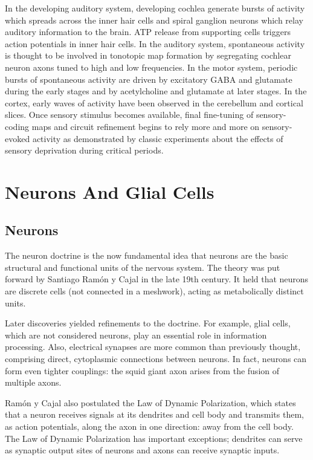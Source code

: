 In the developing auditory system, developing cochlea generate bursts of activity which spreads across the inner hair cells and spiral ganglion neurons which relay auditory information to the brain. ATP release from supporting cells triggers action potentials in inner hair cells. In the auditory system, spontaneous activity is thought to be involved in tonotopic map formation by segregating cochlear neuron axons tuned to high and low frequencies. In the motor system, periodic bursts of spontaneous activity are driven by excitatory GABA and glutamate during the early stages and by acetylcholine and glutamate at later stages. In the cortex, early waves of activity have been observed in the cerebellum and cortical slices. Once sensory stimulus becomes available, final fine-tuning of sensory-coding maps and circuit refinement begins to rely more and more on sensory-evoked activity as demonstrated by classic experiments about the effects of sensory deprivation during critical periods.

\hypertarget{neurons-and-glial-cells}{%
\chapter{Neurons And Glial Cells}\label{neurons-and-glial-cells}}

\hypertarget{neurons}{%
\section{Neurons}\label{neurons}}

The neuron doctrine is the now fundamental idea that neurons are the basic structural and functional units of the nervous system. The theory was put forward by Santiago Ramón y Cajal in the late 19th century. It held that neurons are discrete cells (not connected in a meshwork), acting as metabolically distinct units.

Later discoveries yielded refinements to the doctrine. For example, glial cells, which are not considered neurons, play an essential role in information processing. Also, electrical synapses are more common than previously thought, comprising direct, cytoplasmic connections between neurons. In fact, neurons can form even tighter couplings: the squid giant axon arises from the fusion of multiple axons.

Ramón y Cajal also postulated the Law of Dynamic Polarization, which states that a neuron receives signals at its dendrites and cell body and transmits them, as action potentials, along the axon in one direction: away from the cell body. The Law of Dynamic Polarization has important exceptions; dendrites can serve as synaptic output sites of neurons and axons can receive synaptic inputs.

